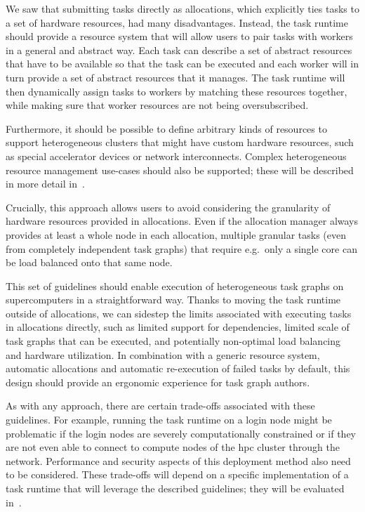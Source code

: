 \begin{description}[wide=0pt]
		We saw that submitting tasks directly as allocations, which explicitly ties tasks to a set of
		hardware resources, had many disadvantages. Instead, the task runtime should provide a resource
		system that will allow users to pair tasks with workers in a general and abstract way. Each task
		can describe a set of abstract resources that have to be available so that the task can be executed
		and each worker will in turn provide a set of abstract resources that it manages. The task runtime
		will then dynamically assign tasks to workers by matching these resources together, while making
		sure that worker resources are not being oversubscribed.

		Furthermore, it should be possible to define arbitrary kinds of resources to support heterogeneous
		clusters that might have custom hardware resources, such as special accelerator devices or network
		interconnects. Complex heterogeneous resource management use-cases should also be supported; these
		will be described in more detail in~.

		Crucially, this approach allows users to avoid considering the granularity of hardware resources
		provided in allocations. Even if the allocation manager always provides at least a whole node in
		each allocation, multiple granular tasks (even from completely independent task graphs) that
		require e.g.\ only a single core can be load balanced onto that same node.
\end{description}

This set of guidelines should enable execution of heterogeneous task graphs on supercomputers in a
straightforward way. Thanks to moving the task runtime outside of allocations, we can sidestep the
limits associated with executing tasks in allocations directly, such as limited support for
dependencies, limited scale of task graphs that can be executed, and potentially non-optimal load
balancing and hardware utilization. In combination with a generic resource system, automatic
allocations and automatic re-execution of failed tasks by default, this design should provide an
ergonomic experience for task graph authors.

As with any approach, there are certain trade-offs associated with these guidelines. For example,
running the task runtime on a login node might be problematic if the login nodes are severely
computationally constrained or if they are not even able to connect to compute nodes of the
\gls{hpc} cluster through the network. Performance and security aspects of this
deployment method also need to be considered. These trade-offs will depend on a specific
implementation of a task runtime that will leverage the described guidelines; they will be
evaluated in~.

